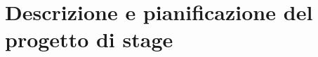 \chapter{Descrizione e pianificazione del progetto di stage}\label{chap:Descrizione e pianificazione stage}







\newpage